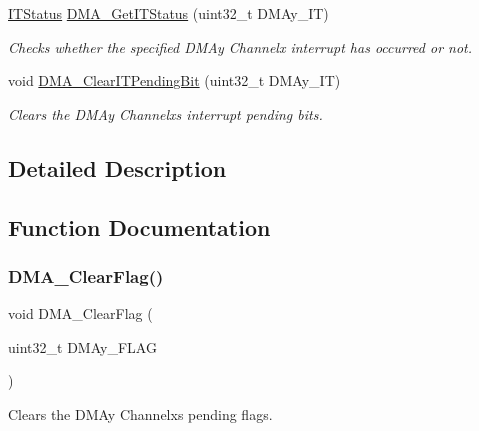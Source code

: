 \begin{DoxyCompactItemize}
\hyperlink{group___exported__types_gaacbd7ed539db0aacd973a0f6eca34074}{I\+T\+Status} \hyperlink{group___d_m_a___private___functions_ga9287331247150fe84d03ecd7ad8adb52}{D\+M\+A\+\_\+\+Get\+I\+T\+Status} (uint32\+\_\+t D\+M\+Ay\+\_\+\+IT)
\begin{DoxyCompactList}\small\item\em Checks whether the specified D\+M\+Ay Channelx interrupt has occurred or not. \end{DoxyCompactList}\item 
void \hyperlink{group___d_m_a___private___functions_ga91a7340e5b334a942f3eb1e05ed5f67a}{D\+M\+A\+\_\+\+Clear\+I\+T\+Pending\+Bit} (uint32\+\_\+t D\+M\+Ay\+\_\+\+IT)
\begin{DoxyCompactList}\small\item\em Clears the D\+M\+Ay Channelx\textquotesingle{}s interrupt pending bits. \end{DoxyCompactList}\end{DoxyCompactItemize}


\subsection{Detailed Description}


\subsection{Function Documentation}
\mbox{\label{group___d_m_a___private___functions_ga25cdca360f309c8ceb7c206cd9ad9119}} 
\subsubsection{\texorpdfstring{D\+M\+A\+\_\+\+Clear\+Flag()}{DMA\_ClearFlag()}}
{\footnotesize\ttfamily void D\+M\+A\+\_\+\+Clear\+Flag (\begin{DoxyParamCaption}\item[{uint32\+\_\+t}]{D\+M\+Ay\+\_\+\+F\+L\+AG }\end{DoxyParamCaption})}



Clears the D\+M\+Ay Channelx\textquotesingle{}s pending flags. 


